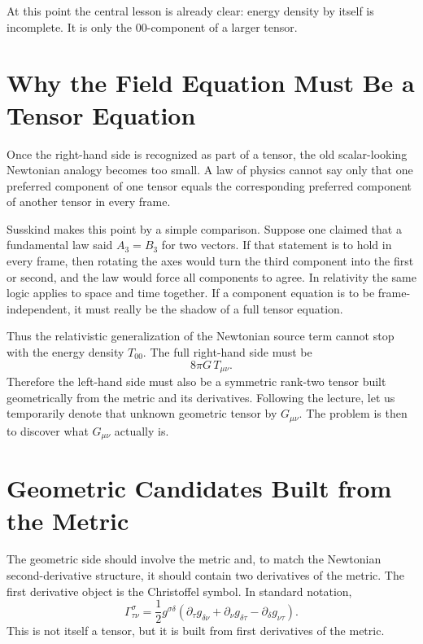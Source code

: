 At this point the central lesson is already clear: energy density by itself is incomplete. It is only the \(00\)-component of a larger tensor.

\section{Why the Field Equation Must Be a Tensor Equation}

Once the right-hand side is recognized as part of a tensor, the old scalar-looking Newtonian analogy becomes too small. A law of physics cannot say only that one preferred component of one tensor equals the corresponding preferred component of another tensor in every frame.

Susskind makes this point by a simple comparison. Suppose one claimed that a fundamental law said \(A_3=B_3\) for two vectors. If that statement is to hold in every frame, then rotating the axes would turn the third component into the first or second, and the law would force all components to agree. In relativity the same logic applies to space and time together. If a component equation is to be frame-independent, it must really be the shadow of a full tensor equation.

Thus the relativistic generalization of the Newtonian source term cannot stop with the energy density \(T_{00}\). The full right-hand side must be
\begin{equation}
8\pi G\,T_{\mu\nu}.
\end{equation}
Therefore the left-hand side must also be a symmetric rank-two tensor built geometrically from the metric and its derivatives. Following the lecture, let us temporarily denote that unknown geometric tensor by \(G_{\mu\nu}\). The problem is then to discover what \(G_{\mu\nu}\) actually is.

\section{Geometric Candidates Built from the Metric}

The geometric side should involve the metric and, to match the Newtonian second-derivative structure, it should contain two derivatives of the metric. The first derivative object is the Christoffel symbol. In standard notation,
\begin{equation}
\Gamma^\sigma_{\tau\nu}
=
\frac12 g^{\sigma\delta}
\left(
\partial_\tau g_{\delta\nu}
+
\partial_\nu g_{\delta\tau}
-
\partial_\delta g_{\nu\tau}
\right).
\end{equation}
This is not itself a tensor, but it is built from first derivatives of the metric.

